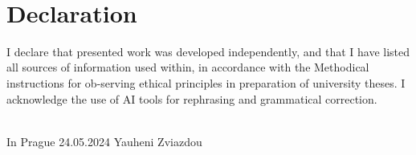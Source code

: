 ~\vfill{}

\section*{Declaration}

I declare that presented work was developed independently, and that I have listed all sources of information used within, in accordance with the Methodical instructions for ob-serving ethical principles in preparation of university theses.
I acknowledge the use of AI tools for rephrasing and grammatical correction.


\vspace{1.5cm}
~\\

In Prague 24.05.2024              \hfill{}                               Yauheni Zviazdou

\hfill{}~~~~~~~~~~~~~~~

\newpage{}
